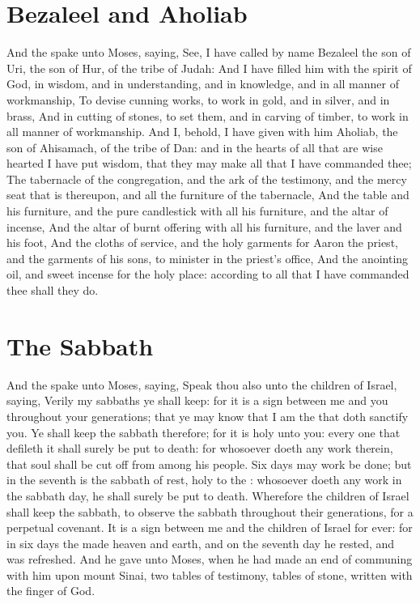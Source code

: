 \section*{Bezaleel and Aholiab}
\begin{biblechapter} %
\verse And the \LORD spake unto Moses, saying,
\verse See, I have called by name Bezaleel the son of Uri, the son of Hur, of the tribe of Judah:
\verse And I have filled him with the spirit of God, in wisdom, and in understanding, and in knowledge, and in all manner of workmanship,
\verse To devise cunning works, to work in gold, and in silver, and in brass,
\verse And in cutting of stones, to set them, and in carving of timber, to work in all manner of workmanship.
\verse And I, behold, I have given with him Aholiab, the son of Ahisamach, of the tribe of Dan: and in the hearts of all that are wise hearted I have put wisdom, that they may make all that I have commanded thee;
\verse The tabernacle of the congregation, and the ark of the testimony, and the mercy seat that is thereupon, and all the furniture of the tabernacle,
\verse And the table and his furniture, and the pure candlestick with all his furniture, and the altar of incense,
\verse And the altar of burnt offering with all his furniture, and the laver and his foot,
\verse And the cloths of service, and the holy garments for Aaron the priest, and the garments of his sons, to minister in the priest's office,
\verse And the anointing oil, and sweet incense for the holy place: according to all that I have commanded thee shall they do.
\section*{The Sabbath}
\verse And the \LORD spake unto Moses, saying,
\verse Speak thou also unto the children of Israel, saying, Verily my sabbaths ye shall keep: for it is a sign between me and you throughout your generations; that ye may know that I am the \LORD that doth sanctify you.
\verse Ye shall keep the sabbath therefore; for it is holy unto you: every one that defileth it shall surely be put to death: for whosoever doeth any work therein, that soul shall be cut off from among his people.
\verse Six days may work be done; but in the seventh is the sabbath of rest, holy to the \LORD: whosoever doeth any work in the sabbath day, he shall surely be put to death.
\verse Wherefore the children of Israel shall keep the sabbath, to observe the sabbath throughout their generations, for a perpetual covenant.
\verse It is a sign between me and the children of Israel for ever: for in six days the \LORD made heaven and earth, and on the seventh day he rested, and was refreshed.
\verse And he gave unto Moses, when he had made an end of communing with him upon mount Sinai, two tables of testimony, tables of stone, written with the finger of God.
\end{biblechapter}

